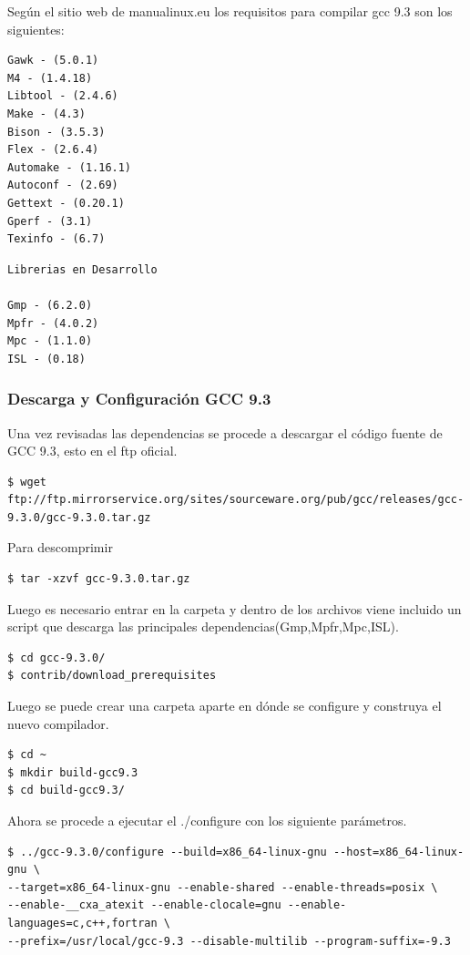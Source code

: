 \documentclass[12pt]{article}
\begin{document}
Según el sitio web de manualinux.eu\cite{mlinux} los requisitos para compilar gcc 9.3 son los siguientes:

\begin{lstlisting}[frame=single,framexrightmargin=15pt]
Gawk - (5.0.1)
M4 - (1.4.18)
Libtool - (2.4.6)
Make - (4.3)
Bison - (3.5.3)
Flex - (2.6.4)
Automake - (1.16.1)
Autoconf - (2.69)
Gettext - (0.20.1)
Gperf - (3.1)
Texinfo - (6.7)
\end{lstlisting}
\bigskip
\bigskip
\begin{lstlisting}[frame=single,framexrightmargin=15pt]
Librerias en Desarrollo

Gmp - (6.2.0)
Mpfr - (4.0.2)
Mpc - (1.1.0)
ISL - (0.18)
\end{lstlisting}

\subsubsection{Descarga y Configuración GCC 9.3}

Una vez revisadas las dependencias se procede a descargar el código fuente de GCC 9.3, esto en el ftp oficial.

\begin{lstlisting}[frame=single,framexrightmargin=15pt]
$ wget ftp://ftp.mirrorservice.org/sites/sourceware.org/pub/gcc/releases/gcc-9.3.0/gcc-9.3.0.tar.gz
\end{lstlisting}

Para descomprimir
\begin{lstlisting}[frame=single,framexrightmargin=15pt]
$ tar -xzvf gcc-9.3.0.tar.gz
\end{lstlisting}

Luego es necesario entrar en la carpeta y dentro de los archivos viene incluido un script que descarga las principales dependencias(Gmp,Mpfr,Mpc,ISL).

\begin{lstlisting}[frame=single]
$ cd gcc-9.3.0/
$ contrib/download_prerequisites
\end{lstlisting}

Luego se puede crear una carpeta aparte en dónde se configure y construya el nuevo compilador.

\begin{lstlisting}[frame=single]
$ cd ~
$ mkdir build-gcc9.3
$ cd build-gcc9.3/
\end{lstlisting}

Ahora se procede a ejecutar el ./configure con los siguiente parámetros.
\begin{lstlisting}[frame=single]
$ ../gcc-9.3.0/configure --build=x86_64-linux-gnu --host=x86_64-linux-gnu \
--target=x86_64-linux-gnu --enable-shared --enable-threads=posix \
--enable-__cxa_atexit --enable-clocale=gnu --enable-languages=c,c++,fortran \
--prefix=/usr/local/gcc-9.3 --disable-multilib --program-suffix=-9.3
\end{lstlisting}
\end{document}
